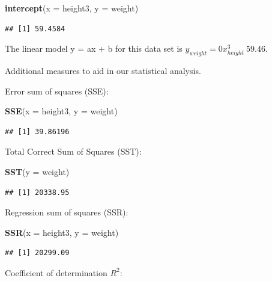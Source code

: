 \documentclass[]{article}
\newenvironment{Shaded}{\begin{snugshade}}{\end{snugshade}}
\newcommand{\KeywordTok}[1]{\textcolor[rgb]{0.13,0.29,0.53}{\textbf{{#1}}}}
\newcommand{\DataTypeTok}[1]{\textcolor[rgb]{0.13,0.29,0.53}{{#1}}}
\newcommand{\NormalTok}[1]{{#1}}
\begin{document}
\begin{Shaded}
\begin{Highlighting}[]
\KeywordTok{intercept}\NormalTok{(}\DataTypeTok{x =} \NormalTok{height3, }\DataTypeTok{y =} \NormalTok{weight)}
\end{Highlighting}
\end{Shaded}

\begin{verbatim}
## [1] 59.4584
\end{verbatim}

The linear model y = ax + b for this data set is
\(y_{weight} = 0x^3_{height}~59.46\).

Additional measures to aid in our statistical analysis.

Error sum of squares (SSE):

\begin{Shaded}
\begin{Highlighting}[]
\KeywordTok{SSE}\NormalTok{(}\DataTypeTok{x =} \NormalTok{height3, }\DataTypeTok{y =} \NormalTok{weight)}
\end{Highlighting}
\end{Shaded}

\begin{verbatim}
## [1] 39.86196
\end{verbatim}

Total Correct Sum of Squares (SST):

\begin{Shaded}
\begin{Highlighting}[]
\KeywordTok{SST}\NormalTok{(}\DataTypeTok{y =} \NormalTok{weight)}
\end{Highlighting}
\end{Shaded}

\begin{verbatim}
## [1] 20338.95
\end{verbatim}

Regression sum of squares (SSR):

\begin{Shaded}
\begin{Highlighting}[]
\KeywordTok{SSR}\NormalTok{(}\DataTypeTok{x =} \NormalTok{height3, }\DataTypeTok{y =} \NormalTok{weight)}
\end{Highlighting}
\end{Shaded}

\begin{verbatim}
## [1] 20299.09
\end{verbatim}

Coefficient of determination \(R^2\):
\end{document}
